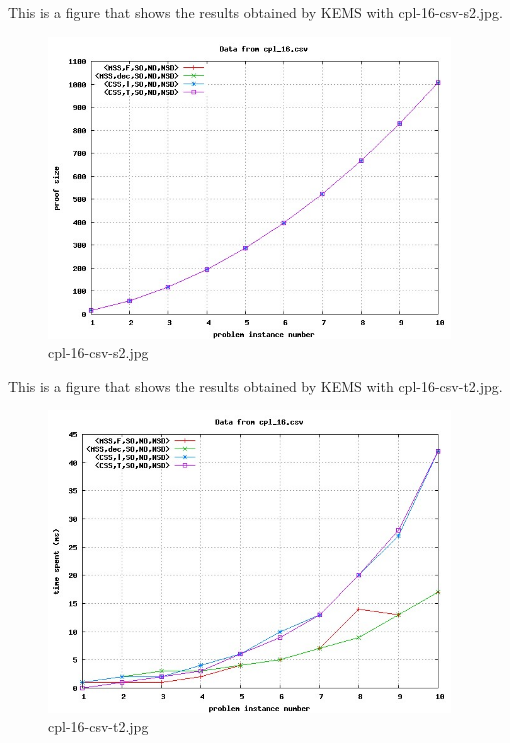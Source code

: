 This is a figure that shows the results obtained by KEMS with cpl-16-csv-s2.jpg.
\begin{figure}[htbp]
\begin{center}
\includegraphics[width=0.95\textwidth]{figuras/cpl-16-csv-s2.jpg}
\end{center}
\caption{cpl-16-csv-s2.jpg}
\end{figure}

This is a figure that shows the results obtained by KEMS with cpl-16-csv-t2.jpg.
\begin{figure}[htbp]
\begin{center}
\includegraphics[width=0.95\textwidth]{figuras/cpl-16-csv-t2.jpg}
\end{center}
\caption{cpl-16-csv-t2.jpg}
\end{figure}

